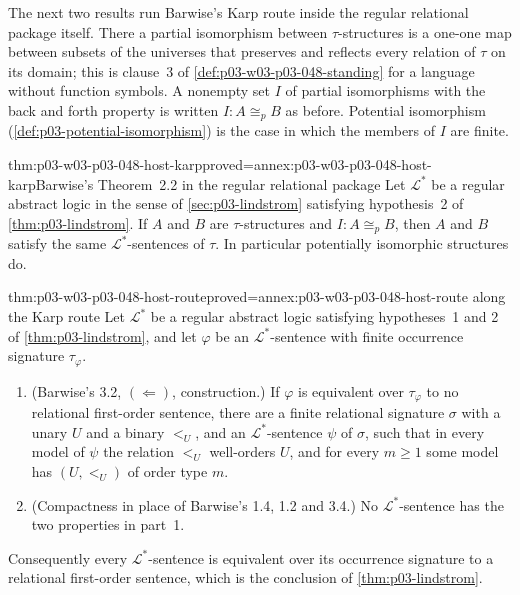The next two results run Barwise's Karp route inside the regular relational
package itself.  There a partial isomorphism between \(\tau\)-structures is a
one-one map between subsets of the universes that preserves and reflects
every relation of \(\tau\) on its domain; this is clause~3 of
\cref{def:p03-w03-p03-048-standing} for a language without function
symbols.  A nonempty set \(I\) of partial isomorphisms with the back and
forth property is written \(I:A\cong_{p}B\) as before.  Potential
isomorphism (\cref{def:p03-potential-isomorphism}) is the case in which the
members of \(I\) are finite.

\begin{hblemma}{thm:p03-w03-p03-048-host-karp}{proved=annex:p03-w03-p03-048-host-karp}{Barwise's Theorem~2.2 in the regular relational package}
Let \(\mathcal L^{\ast}\) be a regular abstract logic in the sense of
\cref{sec:p03-lindstrom} satisfying hypothesis~2 of
\cref{thm:p03-lindstrom}.  If \(A\) and \(B\) are \(\tau\)-structures and
\(I:A\cong_{p}B\), then \(A\) and \(B\) satisfy the same
\(\mathcal L^{\ast}\)-sentences of \(\tau\).  In particular potentially
isomorphic structures do.
\end{hblemma}

\begin{hbtheorem}{thm:p03-w03-p03-048-host-route}{proved=annex:p03-w03-p03-048-host-route}{ along the Karp route}
Let \(\mathcal L^{\ast}\) be a regular abstract logic satisfying
hypotheses~1 and 2 of \cref{thm:p03-lindstrom}, and let \(\varphi\) be an
\(\mathcal L^{\ast}\)-sentence with finite occurrence signature
\(\tau_\varphi\).
\begin{enumerate}
\item (Barwise's 3.2, \((\Leftarrow)\), construction.)  If \(\varphi\) is
      equivalent over \(\tau_\varphi\) to no relational first-order sentence,
      there are a finite relational signature \(\sigma\) with a unary \(U\)
      and a binary \(<_U\), and an \(\mathcal L^{\ast}\)-sentence \(\psi\) of
      \(\sigma\), such that in every model of \(\psi\) the relation \(<_U\)
      well-orders \(U\), and for every \(m\geq1\) some model has
      \((U,<_U)\) of order type \(m\).
\item (Compactness in place of Barwise's 1.4, 1.2 and 3.4.)  No
      \(\mathcal L^{\ast}\)-sentence has the two properties in part~1.
\end{enumerate}
Consequently every \(\mathcal L^{\ast}\)-sentence is equivalent over its
occurrence signature to a relational first-order sentence, which is the
conclusion of \cref{thm:p03-lindstrom}.
\end{hbtheorem}

